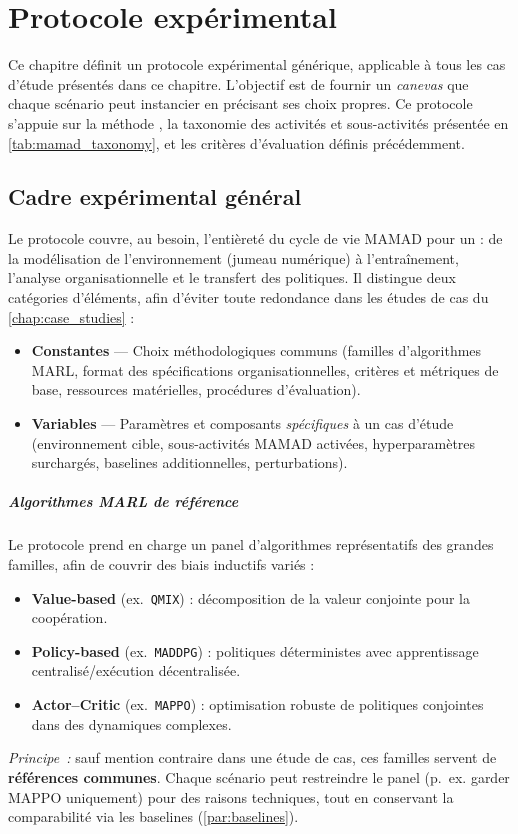 \chapter{Protocole expérimental}
\label{chap:experimental_protocol}

Ce chapitre définit un protocole expérimental générique, applicable à tous les cas d'étude présentés dans ce chapitre.
L'objectif est de fournir un \textit{canevas} que chaque scénario peut instancier en précisant ses choix propres.
Ce protocole s'appuie sur la méthode , la taxonomie des activités et sous-activités présentée en \autoref{tab:mamad_taxonomy}, et les critères d'évaluation définis précédemment.

\section{Cadre expérimental général}
\label{sec:generic_experimental_framework}

Le protocole couvre, au besoin, l’entièreté du cycle de vie MAMAD pour un  : de la modélisation de l’environnement (jumeau numérique) à l’entraînement, l’analyse organisationnelle et le transfert des politiques. Il distingue deux catégories d’éléments, afin d’éviter toute redondance dans les études de cas du \autoref{chap:case_studies} :
\begin{itemize}
  \item \textbf{Constantes} — Choix méthodologiques communs (familles d’algorithmes MARL, format des spécifications organisationnelles, critères et métriques de base, ressources matérielles, procédures d’évaluation).
  \item \textbf{Variables} — Paramètres et composants \textit{spécifiques} à un cas d’étude (environnement cible, sous-activités MAMAD activées, hyperparamètres surchargés, baselines additionnelles, perturbations).
\end{itemize}

\paragraph{Algorithmes MARL de référence}
Le protocole prend en charge un panel d’algorithmes représentatifs des grandes familles, afin de couvrir des biais inductifs variés :
\begin{itemize}
  \item \textbf{Value-based} (ex.~\texttt{QMIX}) : décomposition de la valeur conjointe pour la coopération.
  \item \textbf{Policy-based} (ex.~\texttt{MADDPG}) : politiques déterministes avec apprentissage centralisé/exécution décentralisée.
  \item \textbf{Actor--Critic} (ex.~\texttt{MAPPO}) : optimisation robuste de politiques conjointes dans des dynamiques complexes.
\end{itemize}
\textit{Principe~:} sauf mention contraire dans une étude de cas, ces familles servent de \textbf{références communes}. Chaque scénario peut restreindre le panel (p.~ex. garder MAPPO uniquement) pour des raisons techniques, tout en conservant la comparabilité via les baselines (\autoref{par:baselines}).

